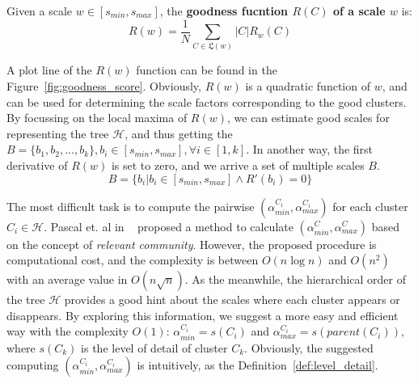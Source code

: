 \begin{definition}
\label{def:goodness_scale} Given a scale $w \in [s_{min},s_{max}]$, the \textbf{goodness fucntion $R(C)$ of a scale $w$} is:
\begin{equation}
\label{equ:goodness_scale}
R(w) = \frac{1}{N}\sum_{C \in \mathfrak{L}(w)} |C|R_{w}(C)
\end{equation}
\end{definition}
A plot line of the $R(w)$ function can be found in the Figure~\ref{fig:goodness_score}. Obviously, $R(w)$ is a quadratic function of $w$, and can be used for determining the scale factors corresponding to the good clusters. By focussing on the local maxima of $R(w)$, we can estimate good scales for representing the tree $\mathcal{H}$, and thus getting the $\mathsf{\textit{B}} = \{b_1, b_2, \ldots, b_k\}, b_i \in [s_{min},s_{max}], \forall i \in [1,k]$. In another way, the first derivative of $R(w)$ is set to zero, and we arrive a set of multiple scales $\mathsf{\textit{B}}$.
\begin{equation}
\label{equ:derivation_R}
\mathsf{\textit{B}} = \{b_i \vert b_i \in [s_{min},s_{max}]  \wedge R'(b_i) = 0\}
\end{equation}

The most difficult task is to compute the pairwise $(\alpha_{min}^{C_i},\alpha_{max}^{C_i})$ for each cluster $C_i \in \mathcal{H}$. Pascal et. al in ~\cite{pons2011postprocessing} proposed a method to calculate $(\alpha_{min}^C,\alpha_{max}^C)$ based on the concept of \emph{relevant community}. However, the proposed procedure is computational cost, and the complexity is between $O(n\log n)$ and $O(n^2)$ with an average value in $O(n \sqrt{n})$. As the meanwhile, the hierarchical order of the tree $\mathcal{H}$ provides a good hint about the scales where each cluster appears or disappears. By exploring this information, we suggest a more easy and efficient way with the complexity $O(1)$: $\alpha_{min}^{C_i} = s(C_i)$ and $\alpha_{max}^{C_i} = s(parent(C_i))$, where $s(C_k)$ is the level of detail of cluster $C_k$. Obviously, the suggested computing $(\alpha_{min}^{C_i},\alpha_{max}^{C_i})$ is intuitively, as the Definition~\ref{def:level_detail}. %

